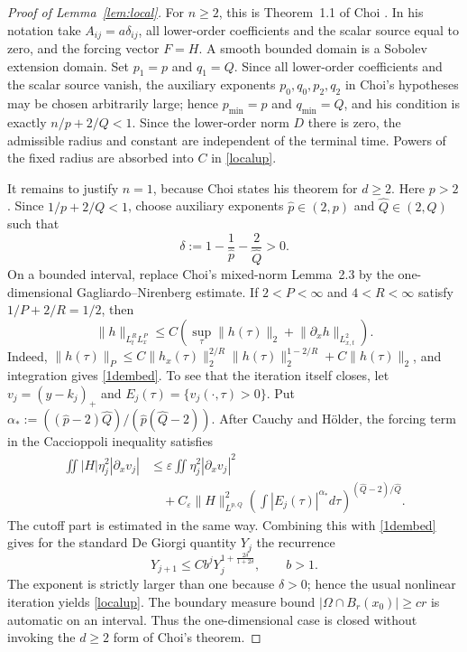 \documentclass[final,5p,times,twocolumn]{elsarticle}
\newcommand{\Om}{\Omega}
\newcommand{\norm}[1]{\lVert#1\rVert}
\begin{document}
\begin{proof}[Proof of Lemma~\ref{lem:local}]
For $n\ge2$, this is Theorem~1.1 of Choi \cite{Choi2016}. In his notation take $A_{ij}=a\delta_{ij}$, all lower-order coefficients and the scalar source equal to zero, and the forcing vector $F=H$. A smooth bounded domain is a Sobolev extension domain. Set $p_1=p$ and $q_1=Q$. Since all lower-order coefficients and the scalar source vanish, the auxiliary exponents $p_0,q_0,p_2,q_2$ in Choi's hypotheses may be chosen arbitrarily large; hence $p_{\min}=p$ and $q_{\min}=Q$, and his condition is exactly $n/p+2/Q<1$. Since the lower-order norm $D$ there is zero, the admissible radius and constant are independent of the terminal time. Powers of the fixed radius are absorbed into $C$ in \eqref{localup}.

It remains to justify $n=1$, because Choi states his theorem for $d\ge2$. Here $p>2$. Since $1/p+2/Q<1$, choose auxiliary exponents $\widehat p\in(2,p)$ and $\widehat Q\in(2,Q)$ such that
\[
\delta:=1-\frac1{\widehat p}-\frac2{\widehat Q}>0.
\]
On a bounded interval, replace Choi's mixed-norm Lemma~2.3 by the one-dimensional Gagliardo--Nirenberg estimate. If $2<P<\infty$ and $4<R<\infty$ satisfy $1/P+2/R=1/2$, then
\begin{equation}\label{1dembed}
\norm h_{L_t^R L_x^P}
\le C\left(\sup_\tau\norm{h(\tau)}_2+\norm{\partial_xh}_{L^2_{x,t}}\right).
\end{equation}
Indeed, $\norm{h(\tau)}_P\le C\norm{h_x(\tau)}_2^{2/R}\norm{h(\tau)}_2^{1-2/R}+C\norm{h(\tau)}_2$, and integration gives \eqref{1dembed}. To see that the iteration itself closes, let $v_j=(y-k_j)_+$ and $E_j(\tau)=\{v_j(\cdot,\tau)>0\}$. Put $\alpha_*:=((\widehat p-2)\widehat Q)/(\widehat p(\widehat Q-2))$. After Cauchy and H\"older, the forcing term in the Caccioppoli inequality satisfies
\[
\begin{aligned}
\iint |H|\eta_j^2|\partial_xv_j|
&\le\varepsilon\iint\eta_j^2|\partial_xv_j|^2\\
&\quad+C_\varepsilon\norm H_{L^{p,Q}}^2
\left(\int |E_j(\tau)|^{\alpha_*}d\tau\right)^{(\widehat Q-2)/\widehat Q}.
\end{aligned}
\]
The cutoff part is estimated in the same way. Combining this with \eqref{1dembed} gives for the standard De Giorgi quantity $Y_j$ the recurrence
\[
Y_{j+1}\le Cb^jY_j^{1+\frac{2\delta}{1+2\delta}},
\qquad b>1.
\]
The exponent is strictly larger than one because $\delta>0$; hence the usual nonlinear iteration yields \eqref{localup}. The boundary measure bound $|\Om\cap B_r(x_0)|\ge cr$ is automatic on an interval. Thus the one-dimensional case is closed without invoking the $d\ge2$ form of Choi's theorem.
\end{proof}
\end{document}
